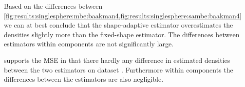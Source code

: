 		Based on the differences between \cref{fig:results:singlesphere:mbe:baakman4,fig:results:singlesphere:sambe:baakman4} we can at best conclude that the shape-adaptive estimator overestimates the densities slightly more than the fixed-shape estimator. 
		The differences between estimators within components are not significantly large.

		 supports the MSE in that there hardly any difference in estimated densities between the two estimators on dataset \baakmanFive. 
		Furthermore within components the differences between the estimators are also negligible. 

